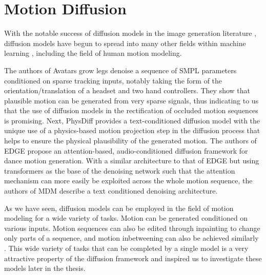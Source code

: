 \section{Motion Diffusion}
\label{sec:related_diffusion}

With the notable success of diffusion models in the image generation literature \cite{ddpm, diffusion_beats_gans, stable_diffusion}, diffusion models have begun to spread into many other fields within machine learning \cite{diffusion_review}, including the field of human motion modeling.


The authors of Avatars grow legs \cite{AvatarsGrowLegs} denoise a sequence of SMPL \cite{SMPL} parameters conditioned on sparse tracking inputs, notably taking the form of the orientation/translation of a headset and two hand controllers. They show that plausible motion can be generated from very sparse signals, thus indicating to us that the use of diffusion models in the rectification of occluded motion sequences is promising. Next, PhysDiff \cite{PhysDiff} provides a text-conditioned diffusion model with the unique use of a physics-based motion projection step in the diffusion process that helps to ensure the physical plausibility of the generated motion. The authors of EDGE \cite{EDGE} propose an attention-based, audio-conditioned diffusion framework for dance motion generation. With a similar architecture to that of EDGE \cite{EDGE} but using transformers as the base of the denoising network such that the attention mechanism can more easily be exploited across the whole motion sequence, the authors of MDM \cite{MDM} describe a text conditioned denoising architecture.

As we have seen, diffusion models can be employed in the field of motion modeling for a wide variety of tasks. Motion can be generated \cite{MDM, EDGE, AvatarsGrowLegs} conditioned on various inputs. Motion sequences can also be edited through inpainting \cite{diffusion_inpainting, MDM} to change only parts of a sequence, and motion inbetweening can also be achieved similarly \cite{MDM}. This wide variety of tasks that can be completed by a single model is a very attractive property of the diffusion framework and inspired us to investigate these models later in the thesis.